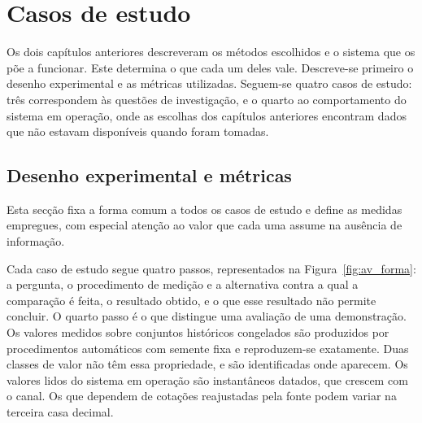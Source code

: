 \chapter{Casos de estudo}
\label{cap:avaliacao}

Os dois capítulos anteriores descreveram os métodos escolhidos e o sistema que os põe a funcionar.
Este determina o que cada um deles vale. Descreve-se primeiro o desenho experimental e as métricas
utilizadas. Seguem-se quatro casos de estudo: três correspondem às questões de investigação, e o
quarto ao comportamento do sistema em operação, onde as escolhas dos capítulos anteriores encontram
dados que não estavam disponíveis quando foram tomadas.

\section{Desenho experimental e métricas}
\label{sec:av_desenho}

Esta secção fixa a forma comum a todos os casos de estudo e define as medidas empregues, com
especial atenção ao valor que cada uma assume na ausência de informação.

Cada caso de estudo segue quatro passos, representados na Figura~\ref{fig:av_forma}: a pergunta, o
procedimento de medição e a alternativa contra a qual a comparação é feita, o resultado obtido, e o
que esse resultado não permite concluir. O quarto passo é o que distingue uma avaliação de uma
demonstração. Os valores medidos sobre conjuntos históricos congelados são produzidos por procedimentos
automáticos com semente fixa e reproduzem-se exatamente. Duas classes de valor não têm essa propriedade, e são identificadas onde aparecem. Os valores
lidos do sistema em operação são instantâneos datados, que crescem com o canal. Os que dependem de
cotações reajustadas pela fonte podem variar na terceira casa decimal.

